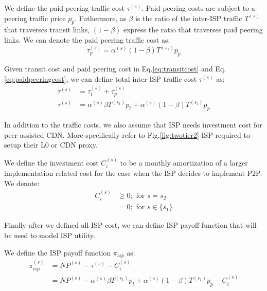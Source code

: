 \documentclass[paper]{ieice}
\begin{document}
\newtheorem{theorem4}{Definition}
\begin{theorem}
We define the paid peering traffic cost $\tau^{(s)}$. 
Paid peering costs are subject to a peering traffic price $p_p$.
Futhermore, as $\beta$ is the ratio of the inter-ISP traffic $T^{(s)}$ that traverses transit links, $(1-\beta)$ express the ratio that traverses paid peering links.
We can denote the paid peering traffic cost as:
\begin{equation}\label{eq:paidpeeringcost}
	\tau^{(s)}_p = \alpha^{(s)} (1-\beta) T^{(s_1)} p_p
\end{equation}
\end{theorem}

\newtheorem{theorem5}{Definition}
\begin{theorem}
Given transit cost and paid peering cost in Eq.\ref{eq:transitcost} and Eq.\ref{eq:paidpeeringcost}, we can define total inter-ISP traffic cost $\tau^{(s)}$ as:
\begin{align}
	\tau^{(s)} &= \tau^{(s)}_t + \tau^{(s)}_p \\
	\tau^{(s)} &= \alpha^{(s)} \beta T^{(s_1)} p_t + \alpha^{(s)} (1-\beta) T^{(s_1)} p_p
\end{align}
\end{theorem}

In addition to the traffic costs, we also assume that ISP needs investment cost for peer-assisted CDN.
More specifically refer to Fig.\ref{fig:twotier2} ISP required to setup their L0 or CDN proxy.

\newtheorem{theorem6}{Definition}
\begin{theorem}
We define the investment cost $C^{(s)}_i$ to be a monthly amortization of a larger implementation related cost for the case when the ISP decides to implement P2P. 
We denote:
\begin{align}
	C^{(s)}_i &\ge 0; \text{ for } s = s_2 \\
	          &= 0; \text{ for } s \in \{s_1\}
\end{align}
\end{theorem}

Finally after we defined all ISP cost, we can define ISP payoff function that will be used to model ISP utility.  

\newtheorem{theorem7}{Definition}
\begin{theorem}
We define the ISP payoff function $\pi_{isp}$ as:
\begin{align}\label{eq:isppayoff}
	\pi_{isp}^{(s)} &= N P^{(s)} - \tau^{(s)} - C_i^{(s)} \\
	 &= N P^{(s)} - \alpha^{(s)} \beta T^{(s_1)} p_t + \alpha^{(s)} (1-\beta) T^{(s_1)} p_p - C_i^{(s)} 
\end{align}
\end{theorem}
\end{document}
